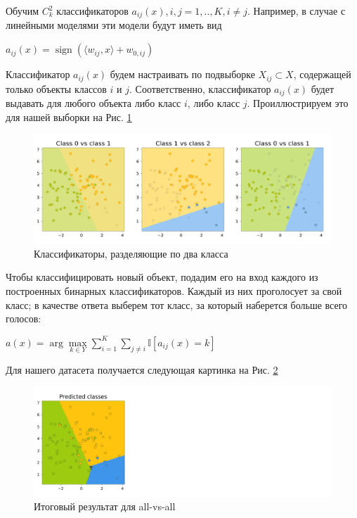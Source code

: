 Обучим  $C^2_k$ классификаторов $a_{ij}(x), i, j = 1,..,K, i \neq j$. Например, в случае с линейными моделями эти модели будут иметь вид

$a_{ij}(x) = \operatorname{sign}(\langle w_{ij}, x \rangle+w_{0,ij})$ 

Классификатор $a_{ij}(x)$ будем настраивать по подвыборке $X_{ij} \subset X$, содержащей только объекты классов $i$ и $j$. Соответственно, классификатор $a_{ij}(x)$ будет выдавать для любого объекта либо класс $i$, либо класс $j$. Проиллюстрируем это для нашей выборки на Рис. \ref{fig:linear-multi-ava-models}

\begin{figure}[H]
	\centering
	\includegraphics[width=0.8\linewidth]{chapters/linear/pics/multi-ava-models.png}
	\caption{Классификаторы, разделяющие по два класса}
	\label{fig:linear-multi-ava-models}
\end{figure}

Чтобы классифицировать новый объект, подадим его на вход каждого из построенных бинарных классификаторов. Каждый из них проголосует за свой класс; в качестве ответа выберем тот класс, за который наберется больше всего голосов:

$a(x) = \operatorname{arg}\max\limits_{k \in Y} \sum\limits_{i=1}^K\sum\limits_{j\neq i} \mathbb{I}[a_{ij}(x) = k]$

Для нашего датасета получается следующая картинка на Рис. \ref{fig:linear-multi-ava-final}

\begin{figure}[H]
	\centering
	\includegraphics[width=0.8\linewidth]{chapters/linear/pics/multi-ava-final.png}
	\caption{Итоговый результат для all-vs-all}
	\label{fig:linear-multi-ava-final}
\end{figure}

